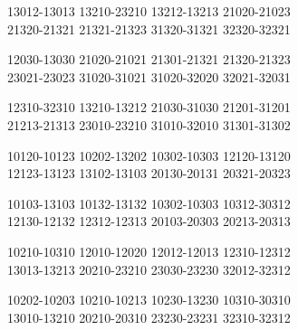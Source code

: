 \begingroup\footnotesize\ttfamily\begin{flushleft}
13012-13013 13210-23210 13212-13213 21020-21023\\
21320-21321 21321-21323 31320-31321 32320-32321\\
\end{flushleft}\endgroup
\begingroup\footnotesize\ttfamily\begin{flushleft}
12030-13030 21020-21021 21301-21321 21320-21323\\
23021-23023 31020-31021 31020-32020 32021-32031\\
\end{flushleft}\endgroup
\begingroup\footnotesize\ttfamily\begin{flushleft}
12310-32310 13210-13212 21030-31030 21201-31201\\
21213-21313 23010-23210 31010-32010 31301-31302\\
\end{flushleft}\endgroup
\begingroup\footnotesize\ttfamily\begin{flushleft}
10120-10123 10202-13202 10302-10303 12120-13120\\
12123-13123 13102-13103 20130-20131 20321-20323\\
\end{flushleft}\endgroup
\begingroup\footnotesize\ttfamily\begin{flushleft}
10103-13103 10132-13132 10302-10303 10312-30312\\
12130-12132 12312-12313 20103-20303 20213-20313\\
\end{flushleft}\endgroup
\begingroup\footnotesize\ttfamily\begin{flushleft}
10210-10310 12010-12020 12012-12013 12310-12312\\
13013-13213 20210-23210 23030-23230 32012-32312\\
\end{flushleft}\endgroup
\begingroup\footnotesize\ttfamily\begin{flushleft}
10202-10203 10210-10213 10230-13230 10310-30310\\
13010-13210 20210-20310 23230-23231 32310-32312\\
\end{flushleft}\endgroup
